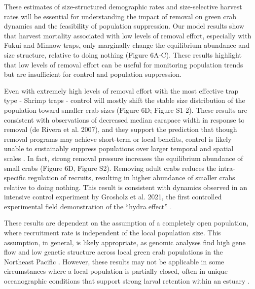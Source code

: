 \documentclass{article}
\begin{document}
These estimates of size-structured demographic rates and size-selective harvest rates will be essential for understanding the impact of removal on green crab dynamics and the feasibility of population suppression. Our model results show that harvest mortality associated with low levels of removal effort, especially with Fukui and Minnow traps, only marginally change the equilibrium abundance and size structure, relative to doing nothing (Figure 6A-C). These results highlight that low levels of removal effort can be useful for monitoring population trends but are insufficient for control and population suppression.

Even with extremely high levels of removal effort with the most effective trap type - Shrimp traps - control will mostly shift the stable size distribution of the population toward smaller crab sizes (Figure 6D; Figure S1-2). These results are consistent with observations of decreased median carapace width in response to removal (de Rivera et al. 2007), and they support the prediction that though removal programs may achieve short-term or local benefits, control is likely unable to sustainably suppress populations over larger temporal and spatial scales \parencite{keller2025transition, tummon2024rebound, kanary2014modelling}. In fact, strong removal pressure increases the equilibrium abundance of small crabs (Figure 6D, Figure S2). Removing adult crabs reduces the intra-specific regulation of recruits, resulting in higher abundance of smaller crabs relative to doing nothing. This result is consistent with dynamics observed in an intensive control experiment by Grosholz et al. 2021, the first controlled experimental field demonstration of the “hydra effect” \parencite{grosholz2021stage}.

These results are dependent on the assumption of a completely open population, where recruitment rate is independent of the local population size. This assumption, in general, is likely appropriate, as genomic analyses find high gene flow and low genetic structure across local green crab populations in the Northeast Pacific \parencite{tepolt2009european, tepolt2022balanced}. However, these results may not be applicable in some circumstances where a local population is partially closed, often in unique oceanographic conditions that support strong larval retention within an estuary \parencite{grosholz2021stage}. 
\end{document}
